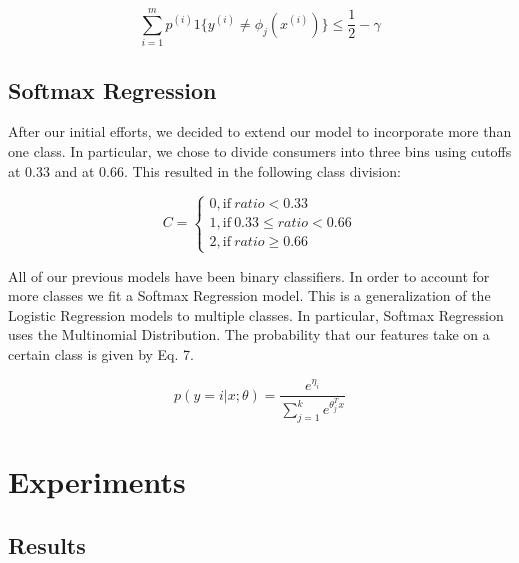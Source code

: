 \documentclass[conference]{IEEEtran}
\begin{document}
\begin{equation}
\sum_{i=1}^{m} p^{(i)} 1 \{y^{(i)} \neq \phi_j(x^{(i)})\}  \leq \frac{1}{2} - \gamma
\end{equation}

\subsection{Softmax Regression}
After our initial efforts, we decided to extend our model to incorporate more than one class. In particular, we chose to divide consumers into three bins using cutoffs at 0.33 and at 0.66. This resulted in the following class division:

\begin{equation}
C=
\begin{cases}
0, \text{if}\ ratio < 0.33 \\
1, \text{if}\ 0.33 \leq ratio < 0.66 \\
2, \text{if}\ ratio \geq 0.66
\end{cases}
\end{equation}

All of our previous models have been binary classifiers. In order to account for more classes we fit a Softmax Regression model. This is a generalization of the Logistic Regression models to multiple classes. In particular, Softmax Regression uses the Multinomial Distribution. The probability that our features take on a certain class is given by Eq. 7.

\begin{equation}
p(y = i | x;\theta) = \frac{e^{\eta_i}}{\sum_{j=1}^{k} e^{\theta_j^Tx}}
\end{equation}

\section{Experiments}

\subsection{Results}
\end{document}

